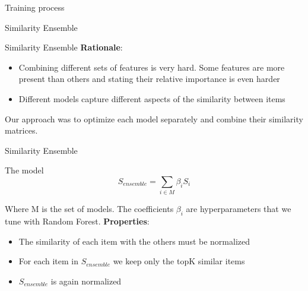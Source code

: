 \documentclass{beamer}
\begin{document}
 	\begin{frame}{Training process}
   \begin{center}
   \end{center}
 \end{frame}
 \begin{frame}[standout]
  Similarity Ensemble
  \end{frame}
  \begin{frame}{Similarity Ensemble}
  \textbf{Rationale}: 
  \begin{itemize}
  \item Combining different sets of features is very hard. Some features are more present than others and stating their relative importance is even harder
  \item Different models capture different aspects of the similarity between items
  \end{itemize}
  Our approach was to optimize each model separately and combine their similarity matrices.
  \end{frame}
  \begin{frame}{Similarity Ensemble}
  \begin{block}{The model}
  $$
  S_{ensemble} = \sum_{i \in M} \beta_i S_i
  $$
  \end{block}  
  Where M is the set of models. \break
  The coefficients $\beta_i$ are hyperparameters that we tune with Random Forest. \break
  \textbf{Properties}: 
  \begin{itemize}
  \item The similarity of each item with the others must be normalized
  \item For each item in $S_{ensemble}$  we keep only the topK similar items
  \item $S_{ensemble}$ is again normalized
  \end{itemize}
  \end{frame}
\end{document}
